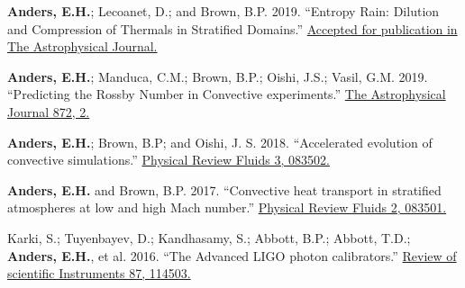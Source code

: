 



\vspace{0.5cm}
\fontsize{12pt}{1em}
\begin{cvitems}
\item
\textbf{Anders, E.H.}; Lecoanet, D.; and Brown, B.P. 2019.
``Entropy Rain: Dilution and Compression of Thermals in Stratified Domains.'' 
\href{https://ui.adsabs.harvard.edu/abs/2019arXiv190602342A/abstract}
{Accepted for publication in The Astrophysical Journal.}
\item
\textbf{Anders, E.H.}; Manduca, C.M.; Brown, B.P.; Oishi, J.S.; Vasil, G.M. 2019.
``Predicting the Rossby Number in Convective experiments.'' 
\href{https://iopscience.iop.org/article/10.3847/1538-4357/aaff61}
{The Astrophysical Journal 872, 2.}
\item
\textbf{Anders, E.H.}; Brown, B.P; and Oishi, J. S. 2018.
``Accelerated evolution of convective simulations.''  
\href{https://journals.aps.org/prfluids/abstract/10.1103/PhysRevFluids.3.083502}
{Physical Review Fluids 3, 083502.}
\item
\textbf{Anders, E.H.} and Brown, B.P. 2017.
``Convective heat transport in stratified atmospheres at low and high Mach number.'' 
\href{https://journals.aps.org/prfluids/abstract/10.1103/PhysRevFluids.2.083501}
{Physical Review Fluids 2, 083501.}
\item
Karki, S.; Tuyenbayev, D.; Kandhasamy, S.; Abbott, B.P.; Abbott, T.D.; \textbf{Anders, E.H.}, et al. 2016.
``The Advanced LIGO photon calibrators.''
\href{https://aip.scitation.org/doi/10.1063/1.4967303}
{Review of scientific Instruments 87, 114503.}
\vspace{0.5cm}
\end{cvitems}

